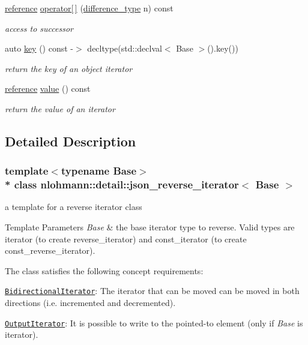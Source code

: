 \begin{DoxyCompactItemize}
\hyperlink{classnlohmann_1_1detail_1_1json__reverse__iterator_a42f51a69bac7b2aebb613b2164e457f1}{reference} \hyperlink{classnlohmann_1_1detail_1_1json__reverse__iterator_ad01fd54e148e36d9e24cf9ad0fe31d00}{operator\mbox{[}$\,$\mbox{]}} (\hyperlink{classnlohmann_1_1detail_1_1json__reverse__iterator_a9ab55987c05ec6427ad36082e351cc45}{difference\+\_\+type} n) const 
\begin{DoxyCompactList}\small\item\em access to successor \end{DoxyCompactList}\item 
auto \hyperlink{classnlohmann_1_1detail_1_1json__reverse__iterator_adc648a641e8e9a1072c5abd56ad06401}{key} () const -\/$>$ decltype(std\+::declval$<$ Base $>$().key())
\begin{DoxyCompactList}\small\item\em return the key of an object iterator \end{DoxyCompactList}\item 
\hyperlink{classnlohmann_1_1detail_1_1json__reverse__iterator_a42f51a69bac7b2aebb613b2164e457f1}{reference} \hyperlink{classnlohmann_1_1detail_1_1json__reverse__iterator_a4c4e94317f95315f95e9909cf8d65dbf}{value} () const 
\begin{DoxyCompactList}\small\item\em return the value of an iterator \end{DoxyCompactList}\end{DoxyCompactItemize}


\subsection{Detailed Description}
\subsubsection*{template$<$typename Base$>$\\*
class nlohmann\+::detail\+::json\+\_\+reverse\+\_\+iterator$<$ Base $>$}

a template for a reverse iterator class 


\begin{DoxyTemplParams}{Template Parameters}
{\em Base} & the base iterator type to reverse. Valid types are iterator (to create reverse\+\_\+iterator) and const\+\_\+iterator (to create const\+\_\+reverse\+\_\+iterator).\\
\hline
\end{DoxyTemplParams}
The class satisfies the following concept requirements\+:
\begin{DoxyItemize}
\item \href{http://en.cppreference.com/w/cpp/concept/BidirectionalIterator}{\tt Bidirectional\+Iterator}\+: The iterator that can be moved can be moved in both directions (i.\+e. incremented and decremented).
\item \href{http://en.cppreference.com/w/cpp/concept/OutputIterator}{\tt Output\+Iterator}\+: It is possible to write to the pointed-\/to element (only if {\itshape Base} is iterator).
\end{DoxyItemize}

